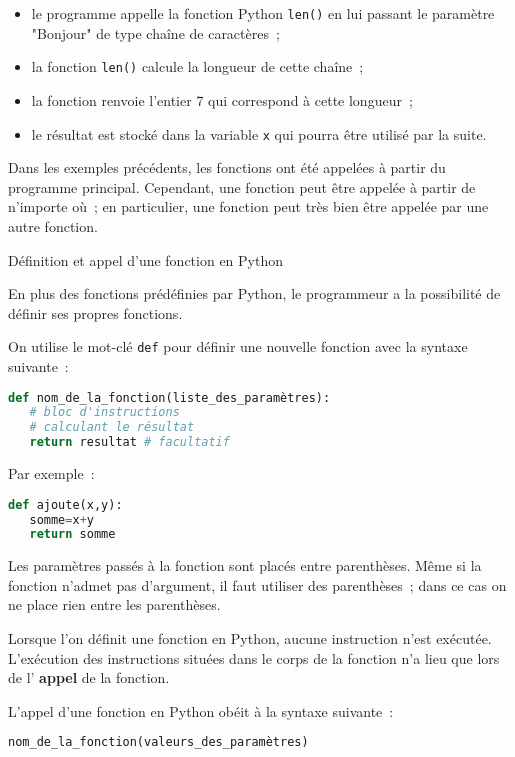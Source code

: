 \par\begin{itemize}
     \item
     le programme appelle la fonction Python \texttt{len()} en lui passant le paramètre "Bonjour" de type chaîne de caractères~;
     \item
     la fonction \texttt{len()} calcule la longueur de cette chaîne~;
     \item
     la fonction renvoie l'entier 7 qui correspond à cette longueur~;
     \item
     le résultat est stocké dans la variable \texttt{x} qui pourra être utilisé par la suite.
\end{itemize}
\par
Dans les exemples précédents, les fonctions ont été appelées à partir du programme principal. Cependant, une fonction peut être appelée à partir de n'importe où~; en particulier, une fonction peut très bien être appelée par une autre fonction.
\begin{h2} Définition et appel d'une fonction en Python \end{h2}
En plus des fonctions prédéfinies par Python, le programmeur a la possibilité de définir ses propres fonctions.
\par
On utilise le mot-clé \texttt{def} pour définir une nouvelle fonction avec la syntaxe suivante~:
\begin{lstlisting}[language=Python]
def nom_de_la_fonction(liste_des_paramètres):
   # bloc d'instructions
   # calculant le résultat
   return resultat # facultatif
\end{lstlisting}
\par
Par exemple~:
 \begin{lstlisting}[language=Python]
def ajoute(x,y):
   somme=x+y
   return somme
\end{lstlisting}
\par
Les paramètres passés à la fonction sont placés entre parenthèses. Même si la fonction n'admet pas d'argument, il faut utiliser des parenthèses~; dans ce cas on ne place rien entre les parenthèses.
\par
Lorsque l'on définit une fonction en Python, aucune instruction n'est exécutée. L'exécution des instructions situées dans le corps de la fonction n'a lieu que lors de l' \textbf{appel} de la fonction.
\par
L'appel d'une fonction en Python obéit à la syntaxe suivante~:
\begin{lstlisting}[language=Python]
nom_de_la_fonction(valeurs_des_paramètres)
\end{lstlisting}
